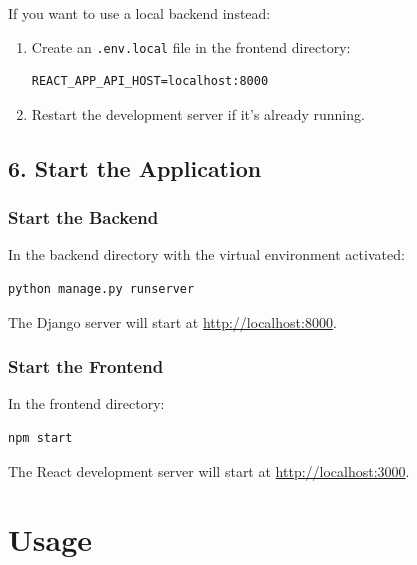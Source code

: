 If you want to use a local backend instead:

\begin{enumerate}
    \item Create an \texttt{.env.local} file in the frontend directory:
\begin{lstlisting}
REACT_APP_API_HOST=localhost:8000
\end{lstlisting}
    \item Restart the development server if it's already running.
\end{enumerate}

\subsection*{6. Start the Application}

\subsubsection*{Start the Backend}

In the backend directory with the virtual environment activated:

\begin{lstlisting}[language=bash]
python manage.py runserver
\end{lstlisting}

The Django server will start at \url{http://localhost:8000}.

\subsubsection*{Start the Frontend}

In the frontend directory:

\begin{lstlisting}[language=bash]
npm start
\end{lstlisting}

The React development server will start at \url{http://localhost:3000}.

\section*{Usage}


